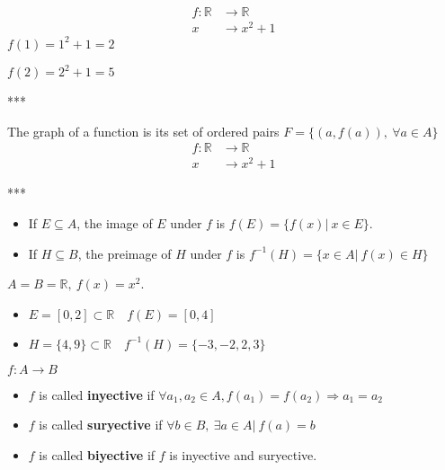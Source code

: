 \documentclass[12pt, a4paper]{book}
\begin{document}
\begin{exmp}
  \begin{align*}
    f:\mathbb{R} &\longrightarrow \mathbb{R} \\
    x &\longrightarrow x^2+1
  \end{align*}
  $f(1) = 1^2+1 = 2$

  $f(2) = 2^2+1 = 5$

  ***
\end{exmp}

\begin{defn}
  The graph of a function is its set of ordered pairs $F=\{(a,f(a)),\ \forall a\in A\}$
  \begin{align*}
    f:\mathbb{R} &\longrightarrow \mathbb{R} \\
    x &\longrightarrow x^2+1
  \end{align*}

  ***
\end{defn}

\begin{defn}
  \begin{itemize}
    \item If $E \subseteq A$, the image of $E$ under $f$ is $f(E) = \{f(x)\vert\ x\in E\}$.
    \item If $H \subseteq B$, the preimage of $H$ under $f$ is $f^{-1}(H) = \{x\in A\vert\ f(x)\in H\}$
  \end{itemize}
\end{defn}

\begin{exmp}
  $A=B=\mathbb{R},\ f(x) = x^2$.
  \begin{itemize}
    \item $E = [0,2] \subset \mathbb{R} \quad f(E) = [0,4]$
    \item $H = \{4,9\} \subset \mathbb{R} \quad f^{-1}(H) = \{-3,-2,2,3\}$
  \end{itemize}
\end{exmp}

\begin{defn}
  $f:A\longrightarrow B$
  \begin{itemize}
    \item $f$ is called \textbf{inyective} if $\forall a_1,a_2 \in A, f(a_1)=f(a_2) \Rightarrow a_1=a_2$
    \item $f$ is called \textbf{suryective} if $\forall b \in B,\ \exists a\in A \vert\ f(a)=b$
    \item $f$ is called \textbf{biyective} if $f$ is inyective and suryective.
  \end{itemize}
\end{defn}
\end{document}
